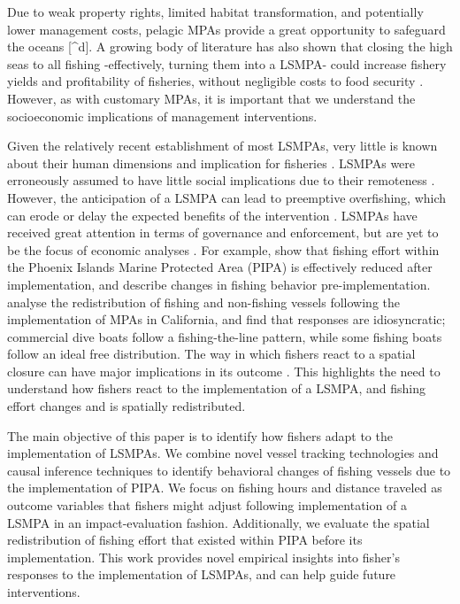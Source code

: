 \documentclass[12pt,]{article}
\begin{document}
Due to weak property rights, limited habitat transformation, and
potentially lower management costs, pelagic MPAs provide a great
opportunity to safeguard the oceans \citet{game_2009}{[}\^{}d{]}. A
growing body of literature has also shown that closing the high seas to
all fishing -effectively, turning them into a LSMPA- could increase
fishery yields and profitability of fisheries, without negligible costs
to food security
\citep{white_2014,sumaila_2015,sala_2018,schiller_2018}. However, as
with customary MPAs, it is important that we understand the
socioeconomic implications of management interventions.

Given the relatively recent establishment of most LSMPAs, very little is
known about their human dimensions and implication for fisheries
\citep{gray_2017}. LSMPAs were erroneously assumed to have little social
implications due to their remoteness \citep{agardy_2011,gray_2017}.
However, the anticipation of a LSMPA can lead to preemptive overfishing,
which can erode or delay the expected benefits of the intervention
\citep{mcdermott_2018}. LSMPAs have received great attention in terms of
governance and enforcement, but are yet to be the focus of economic
analyses \citep{gray_2017}. For example, \citet{mcdermott_2018} show
that fishing effort within the Phoenix Islands Marine Protected Area
(PIPA) is effectively reduced after implementation, and describe changes
in fishing behavior pre-implementation. \citet{cabral_2017} analyse the
redistribution of fishing and non-fishing vessels following the
implementation of MPAs in California, and find that responses are
idiosyncratic; commercial dive boats follow a fishing-the-line pattern,
while some fishing boats follow an ideal free distribution. The way in
which fishers react to a spatial closure can have major implications in
its outcome \citep{hilborn_2006,krueck_2017,viana_2017}. This highlights
the need to understand how fishers react to the implementation of a
LSMPA, and fishing effort changes and is spatially redistributed.

The main objective of this paper is to identify how fishers adapt to the
implementation of LSMPAs. We combine novel vessel tracking technologies
and causal inference techniques to identify behavioral changes of
fishing vessels due to the implementation of PIPA. We focus on fishing
hours and distance traveled as outcome variables that fishers might
adjust following implementation of a LSMPA in an impact-evaluation
fashion. Additionally, we evaluate the spatial redistribution of fishing
effort that existed within PIPA before its implementation. This work
provides novel empirical insights into fisher's responses to the
implementation of LSMPAs, and can help guide future interventions.
\end{document}
